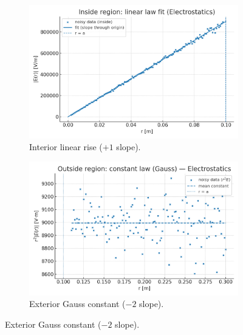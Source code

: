 \documentclass[12pt,a4paper,oneside]{scrreprt}
\begin{document}
\begin{figure}[htbp]\centering
  \begin{subfigure}[t]{0.49\linewidth}
    \includegraphics[width=\linewidth]{fig/electrostatics_inside_fit.png}
    \caption{Interior linear rise ($+1$ slope).}
    \label{fig:em:inside}
  \end{subfigure}\hfill
  \begin{subfigure}[t]{0.49\linewidth}
    \includegraphics[width=\linewidth]{fig/electrostatics_outside_constant.png}
    \caption{Exterior Gauss constant ($-2$ slope).}
    \label{fig:em:cout}
  \end{subfigure}


\end{figure}
\end{document}
